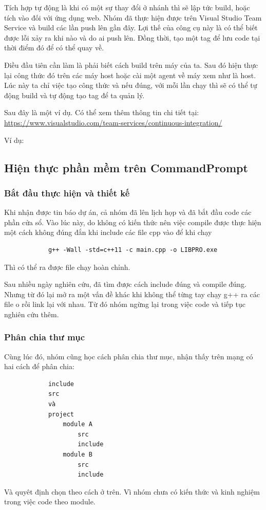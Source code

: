 \documentclass[12pt,a4paper]{report}
\begin{document}
			Tích hợp tự động là khi có một sự thay đổi ở nhánh thì sẽ lập tức build, hoặc tích vào đối với ứng dụng web. Nhóm đã thực hiện được trên Visual Studio Team Service và build các lần push lên gần đây. Lợi thế của công cụ này là có thể biết được lỗi xảy ra khi nào và do ai push lên. Đồng thời, tạo một tag để lưu code tại thời điểm đó để có thể quay về. \par

			Điều đầu tiên cần làm là phải biết cách build trên máy của ta. Sau đó hiện thực lại công thức đó trên các máy host hoặc cài một agent về máy xem như là host. Lúc này ta chỉ việc tạo công thức và nếu đúng, với mỗi lần chạy thì sẽ có thể tự động build và tự động tạo tag để ta quản lý.\par

			Sau đây là một ví dụ. Có thể xem thêm thông tin chi tiết tại: \url{https://www.visualstudio.com/team-services/continuous-integration/}\par

			Ví dụ:
		\subsection{Hiện thực phần mềm trên CommandPrompt}
			\subsubsection{Bắt đầu thực hiện và thiết kế}
			Khi nhận được tin báo dự án, cả nhóm đã lên lịch họp và đã bắt đầu code các phần cửa sổ. Vào lúc này, do không có kiến thức nên việc compile được thực hiện một cách không đúng đắn khi include các file cpp vào để khi chạy
			\begin{verbatim}
			g++ -Wall -std=c++11 -c main.cpp -o LIBPRO.exe
			\end{verbatim}
			Thì có thể ra được file chạy hoàn chỉnh.\par

			Sau nhiều ngày nghiên cứu, đã tìm được cách include đúng và compile đúng. Nhưng từ đó lại mở ra một vấn đề khác khi không thể từng tay chạy g++ ra các file o rồi link lại với nhau. Từ đó nhóm ngừng lại trong việc code và tiếp tục nghiên cứu thêm.
			\subsubsection{Phân chia thư mục}
			Cùng lúc đó, nhóm cũng học cách phân chia thư mục, nhận thấy trên mạng có hai cách để phân chia:
			\begin{verbatim}
			include
			src
			và
			project
				module A
					src
					include
				module B
					src
					include
			\end{verbatim}
			Và quyêt định chọn theo cách ở trên. Vì nhóm chưa có kiến thức và kinh nghiệm trong việc code theo module.
\end{document}
